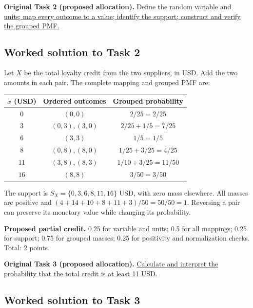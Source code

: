 \par\vspace{3mm}\secInicio[][sec:q2]

\textbf{Original Task 2 (proposed allocation).} \hyperref[sol:q2t2]{Define the random variable and units; map every outcome to a value; identify the support; construct and verify the grouped PMF.} 


\subsection*{Worked solution to Task 2 }
\label{sol:q2t2}

Let $X$ be the total loyalty credit from the two suppliers, in USD. Add the two amounts in each pair. The complete mapping and grouped PMF are:

\begin{center}
\begin{tabular}{ccc}\toprule
$x$ (USD) & Ordered outcomes & Grouped probability\\\midrule
$0$ & $(0,0)$ & $2/25=2/25$\\
$3$ & $(0,3),(3,0)$ & $2/25+1/5=7/25$\\
$6$ & $(3,3)$ & $1/5=1/5$\\
$8$ & $(0,8),(8,0)$ & $1/25+3/25=4/25$\\
$11$ & $(3,8),(8,3)$ & $1/10+3/25=11/50$\\
$16$ & $(8,8)$ & $3/50=3/50$\\
\bottomrule\end{tabular}
\end{center}


The support is $S_X=\{0,3,6,8,11,16\}$ USD, with zero mass elsewhere. All masses are positive and $(4+14+10+8+11+3)/50=50/50=1$. Reversing a pair can preserve its monetary value while changing its probability.

\textbf{Proposed partial credit.} 0.25 for variable and units; 0.5 for all mappings; 0.25 for support; 0.75 for grouped masses; 0.25 for positivity and normalization checks. Total: 2 points.

\par\vspace{3mm}\secInicio[][sec:q2]

\textbf{Original Task 3 (proposed allocation).} \hyperref[sol:q2t3]{Calculate and interpret the probability that the total credit is at least 11 USD.} 


\subsection*{Worked solution to Task 3 }
\label{sol:q2t3}

